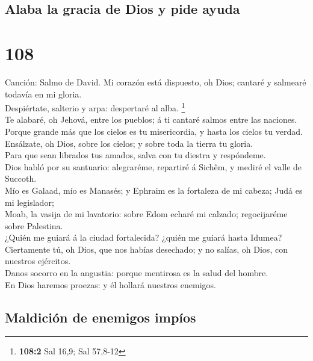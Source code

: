 \hypertarget{alaba-la-gracia-de-dios-y-pide-ayuda}{%
\subsection{Alaba la gracia de Dios y pide
ayuda}\label{alaba-la-gracia-de-dios-y-pide-ayuda}}

\hypertarget{section-107}{%
\section{108}\label{section-107}}

 Canción: Salmo de David. Mi corazón está dispuesto, oh
Dios; cantaré y salmearé todavía en mi gloria.\\
 Despiértate, salterio y arpa: despertaré al alba.
\footnote{\textbf{108:2} Sal 16,9; Sal 57,8-12}\\
 Te alabaré, oh Jehová, entre los pueblos; á ti cantaré
salmos entre las naciones.\\
 Porque grande más que los cielos es tu misericordia, y
hasta los cielos tu verdad.\\
 Ensálzate, oh Dios, sobre los cielos; y sobre toda la
tierra tu gloria.\\
 Para que sean librados tus amados, salva con tu diestra y
respóndeme.\\
 Dios habló por su santuario: alegraréme, repartiré á
Sichêm, y mediré el valle de Succoth.\\
 Mío es Galaad, mío es Manasés; y Ephraim es la fortaleza de
mi cabeza; Judá es mi legislador;\\
 Moab, la vasija de mi lavatorio: sobre Edom echaré mi
calzado; regocijaréme sobre Palestina.\\
 ¿Quién me guiará á la ciudad fortalecida? ¿quién me guiará
hasta Idumea?\\
 Ciertamente tú, oh Dios, que nos habías desechado; y no
salías, oh Dios, con nuestros ejércitos.\\
 Danos socorro en la angustia: porque mentirosa es la salud
del hombre.\\
 En Dios haremos proezas: y él hollará nuestros enemigos.

\hypertarget{maldiciuxf3n-de-enemigos-impuxedos}{%
\subsection{Maldición de enemigos
impíos}\label{maldiciuxf3n-de-enemigos-impuxedos}}

